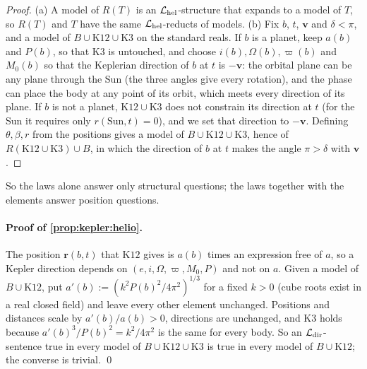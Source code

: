 \begin{proof}
(a) A model of $R(T)$ is an $\mathcal L_{\rm hel}$-structure that expands to a model of $T$, so $R(T)$ and $T$ have the same $\mathcal L_{\rm hel}$-reducts of models. (b) Fix $b$, $t$, $\mathbf v$ and $\delta<\pi$, and a model of $B\cup\mathrm{K12}\cup\mathrm{K3}$ on the standard reals. If $b$ is a planet, keep $a(b)$ and $P(b)$, so that $\mathrm{K3}$ is untouched, and choose $i(b),\Omega(b),\varpi(b)$ and $M_0(b)$ so that the Keplerian direction of $b$ at $t$ is $-\mathbf v$: the orbital plane can be any plane through the Sun (the three angles give every rotation), and the phase can place the body at any point of its orbit, which meets every direction of its plane. If $b$ is not a planet, $\mathrm{K12}\cup\mathrm{K3}$ does not constrain its direction at $t$ (for the Sun it requires only $r(\mathrm{Sun},t)=0$), and we set that direction to $-\mathbf v$. Defining $\theta,\beta,r$ from the positions gives a model of $B\cup\mathrm{K12}\cup\mathrm{K3}$, hence of $R(\mathrm{K12}\cup\mathrm{K3})\cup B$, in which the direction of $b$ at $t$ makes the angle $\pi>\delta$ with $\mathbf v$.
\end{proof}

So the laws alone answer only structural questions; the laws together with the elements answer position questions.

\paragraph{Proof of \cref{prop:kepler:helio}.}
The position $\mathbf r(b,t)$ that $\mathrm{K12}$ gives is $a(b)$ times an expression free of $a$, so a Kepler direction depends on $(e,i,\Omega,\varpi,M_0,P)$ and not on $a$. Given a model of $B\cup\mathrm{K12}$, put $a'(b):=(k^2P(b)^2/4\pi^2)^{1/3}$ for a fixed $k>0$ (cube roots exist in a real closed field) and leave every other element unchanged. Positions and distances scale by $a'(b)/a(b)>0$, directions are unchanged, and $\mathrm{K3}$ holds because $a'(b)^3/P(b)^2=k^2/4\pi^2$ is the same for every body. So an $\mathcal L_{\rm dir}$-sentence true in every model of $B\cup\mathrm{K12}\cup\mathrm{K3}$ is true in every model of $B\cup\mathrm{K12}$; the converse is trivial. \qed

